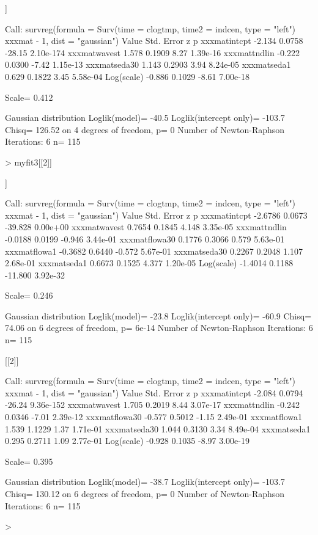 \documentclass[11pt]{article}
\begin{document}
\begin{Schunk}
\begin{Soutput}
[[2]]

Call:
survreg(formula = Surv(time = clogtmp, time2 = indcen, type = "left") ~ 
    xxxmat - 1, dist = "gaussian")
              Value Std. Error      z         p
xxxmatintcpt -2.134     0.0758 -28.15 2.10e-174
xxxmatwavest  1.578     0.1909   8.27  1.39e-16
xxxmattndlin -0.222     0.0300  -7.42  1.15e-13
xxxmatseda30  1.143     0.2903   3.94  8.24e-05
xxxmatseda1   0.629     0.1822   3.45  5.58e-04
Log(scale)   -0.886     0.1029  -8.61  7.00e-18

Scale= 0.412 

Gaussian distribution
Loglik(model)= -40.5   Loglik(intercept only)= -103.7
	Chisq= 126.52 on 4 degrees of freedom, p= 0 
Number of Newton-Raphson Iterations: 6 
n= 115 
\end{Soutput}
\begin{Sinput}
> myfit3[[2]]
\end{Sinput}
\begin{Soutput}
[[1]]

Call:
survreg(formula = Surv(time = clogtmp, time2 = indcen, type = "left") ~ 
    xxxmat - 1, dist = "gaussian")
                Value Std. Error       z        p
xxxmatintcpt  -2.6786     0.0673 -39.828 0.00e+00
xxxmatwavest   0.7654     0.1845   4.148 3.35e-05
xxxmattndlin  -0.0188     0.0199  -0.946 3.44e-01
xxxmatflowa30  0.1776     0.3066   0.579 5.63e-01
xxxmatflowa1  -0.3682     0.6440  -0.572 5.67e-01
xxxmatseda30   0.2267     0.2048   1.107 2.68e-01
xxxmatseda1    0.6673     0.1525   4.377 1.20e-05
Log(scale)    -1.4014     0.1188 -11.800 3.92e-32

Scale= 0.246 

Gaussian distribution
Loglik(model)= -23.8   Loglik(intercept only)= -60.9
	Chisq= 74.06 on 6 degrees of freedom, p= 6e-14 
Number of Newton-Raphson Iterations: 6 
n= 115 


[[2]]

Call:
survreg(formula = Surv(time = clogtmp, time2 = indcen, type = "left") ~ 
    xxxmat - 1, dist = "gaussian")
               Value Std. Error      z         p
xxxmatintcpt  -2.084     0.0794 -26.24 9.36e-152
xxxmatwavest   1.705     0.2019   8.44  3.07e-17
xxxmattndlin  -0.242     0.0346  -7.01  2.39e-12
xxxmatflowa30 -0.577     0.5012  -1.15  2.49e-01
xxxmatflowa1   1.539     1.1229   1.37  1.71e-01
xxxmatseda30   1.044     0.3130   3.34  8.49e-04
xxxmatseda1    0.295     0.2711   1.09  2.77e-01
Log(scale)    -0.928     0.1035  -8.97  3.00e-19

Scale= 0.395 

Gaussian distribution
Loglik(model)= -38.7   Loglik(intercept only)= -103.7
	Chisq= 130.12 on 6 degrees of freedom, p= 0 
Number of Newton-Raphson Iterations: 6 
n= 115 
\end{Soutput}
\begin{Sinput}
> 
\end{Sinput}
\end{Schunk}
\end{document}
